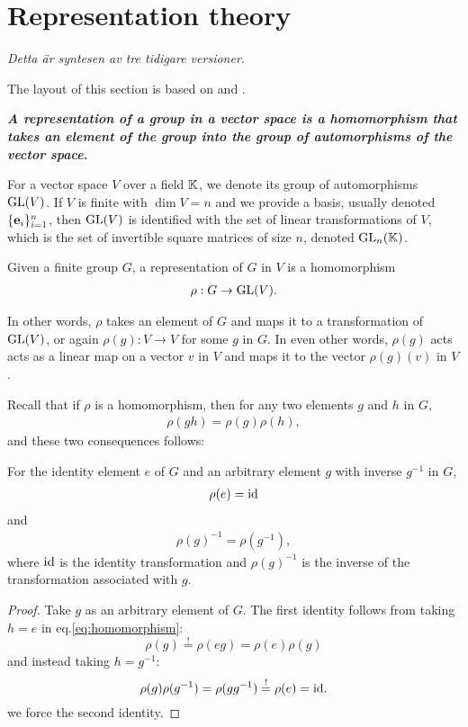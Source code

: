 \clearpage{\thispagestyle{empty}}
\section{Representation theory}

	\textit{Detta är syntesen av tre tidigare versioner. }
	
	The layout of this section is based on \cite{Serre} and \cite{FultonHarris}.
	
	\textbf{\emph{A representation of a group in a vector space is a homomorphism that takes an element of the group into the group of automorphisms of the vector space.}}
	
	For a vector space $V$ over a field $\mathbb{K}$, we denote its group of automorphisms $\text{GL}(V)$. If $V$ is finite with $\dim V = n$ and we provide a basis, usually denoted $\{\mathbf{e}_i\}_{i=1}^n$, then $\text{GL}(V)$ is identified with the set of linear transformations of $V$, which is the set of invertible square matrices of size $n$, denoted $\text{GL}_n(\mathbb{K})$\cite[18.1]{DummitFoote}. 
	
	\begin{definition}[Representation]
		Given a finite group $G$, a representation of $G$ in $V$ is a homomorphism
		\begin{align}
			\rho: G \rightarrow \text{GL}(V).
		\end{align}
	\end{definition}
	In other words, $\rho$ takes an element of $G$ and maps it to a transformation of $\text{GL}(V)$, or again $\rho(g): V \rightarrow V$ for some $g$ in $G$. In even other words, $\rho(g)$ acts acts as a linear map on a vector $v$ in $V$ and maps it to the vector $\rho(g)(v)$ in $V$.
	
	Recall that if $\rho$ is a homomorphism, then for any two elements $g$ and $h$ in $G$,
	\begin{align}\label{eq:homomorphism}
		\rho(gh) = \rho(g)\rho(h),
	\end{align}
	and these two consequences follows:	
	\begin{proposition}
		For the identity element $e$ of $G$ and an arbitrary element $g$ with inverse $g^{-1}$ in $G$,
		\begin{align}
			\rho(e) = \text{id}
		\end{align}
		and
		\begin{align}
			\rho(g)^{-1} = \rho(g^{-1}),
		\end{align}
		where $\text{id}$ is the identity transformation and $\rho(g)^{-1}$ is the inverse of the transformation associated with $g$.
	\end{proposition}
	\begin{proof}
		Take $g$ as an arbitrary element of $G$. The first identity follows from taking $h=e$ in eq.\ref{eq:homomorphism}:
		\[
		\rho(g) \overset{!}{=} \rho(eg) = \rho(e)\rho(g)
		\]
		and instead taking $h=g^{-1}$:
		\[
		\rho(g) \rho(g^{-1}) =  \rho(gg^{-1}) \overset{!}{=} \rho(e) = \text{id}.
		\]
		we force the second identity.
	\end{proof}
	
